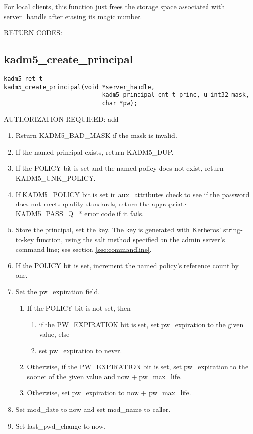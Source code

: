 For local clients, this function just frees the storage space
associated with server_handle after erasing its magic number.

RETURN CODES:

\subsection{kadm5_create_principal}

\begin{verbatim}
kadm5_ret_t
kadm5_create_principal(void *server_handle,
                            kadm5_principal_ent_t princ, u_int32 mask,
                            char *pw);
\end{verbatim}

AUTHORIZATION REQUIRED: add

\begin{enumerate}

\item Return KADM5_BAD_MASK if the mask is invalid.
\item If the named principal exists, return KADM5_DUP.
\item If the POLICY bit is set and the named policy does not exist,
return KADM5_UNK_POLICY.
\item If KADM5_POLICY bit is set in aux_attributes check to see if
the password does not meets quality standards, return the appropriate
KADM5_PASS_Q_* error code if it fails.
\item Store the principal, set the key.  The key is generated with
Kerberos' string-to-key function, using the salt method specified on
the admin server's command line; see section \ref{sec:commandline}.
\item If the POLICY bit is set, increment the named policy's reference
count by one.

\item Set the pw_expiration field.
\begin{enumerate}
\item If the POLICY bit is not set, then
\begin{enumerate}
\item if the PW_EXPIRATION bit is set, set pw_expiration to the given
value, else
\item set pw_expiration to never.
\end{enumerate}
\item Otherwise, if the PW_EXPIRATION bit is set, set pw_expiration to
the sooner of the given value and now + pw_max_life.
\item Otherwise, set pw_expiration to now + pw_max_life.
\end{enumerate}

\item Set mod_date to now and set mod_name to caller.
\item Set last_pwd_change to now.
\end{enumerate}

